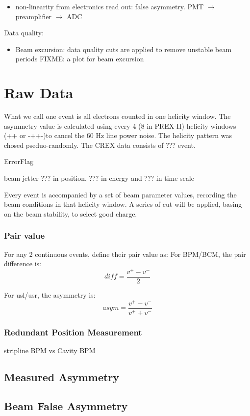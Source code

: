 \begin{itemize}
    \item non-linearity from electronics read out: false asymmetry. PMT $\rightarrow$
	preamplifier $\rightarrow$ ADC
\end{itemize}

Data quality:
\begin{itemize}
    \item Beam excursion: data quality cuts are applied to remove unstable beam periods
	FIXME: a plot for beam excursion
\end{itemize}

\section{Raw Data}
What we call one event is all electrons counted in one helicity window.
The asymmetry value is calculated using every 4 (8 in PREX-II) helicity windows
(+\-\-+ or -++-)to cancel the 60 Hz line power noise. The helicity pattern was
chosed pseduo-randomly. The CREX data consists of ??? event.

ErrorFlag 

beam jetter ??? in position, ??? in energy and ??? in time scale

Every event
is accompanied by a set of beam parameter values, recording the beam conditions
in that helicity window. A series of cut will be applied, basing on the beam
stability, to select good charge.

\subsubsection{Pair value}
For any 2 continuous events, define their pair value as:
For BPM/BCM, the pair difference is:
$$ diff = \frac{v^+ - v^-}{2} $$

For usl/usr, the asymmetry is:
$$ asym = \frac{v^+ - v^-}{v^+ + v^-} $$

\subsubsection{Redundant Position Measurement}
stripline BPM vs Cavity BPM

\subsection{Measured Asymmetry}
\subsection{Beam False Asymmetry}

